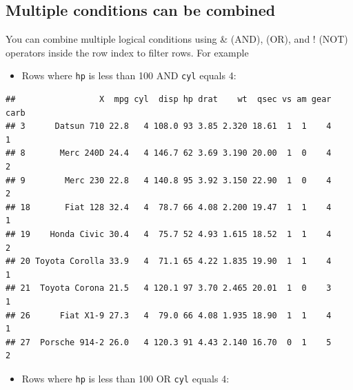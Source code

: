 \documentclass[
]{article}
\newenvironment{Shaded}{\begin{snugshade}}{\end{snugshade}}
\newcommand{\DecValTok}[1]{\textcolor[rgb]{0.00,0.00,0.81}{#1}}
\newcommand{\NormalTok}[1]{#1}
\newcommand{\SpecialCharTok}[1]{\textcolor[rgb]{0.81,0.36,0.00}{\textbf{#1}}}
\providecommand{\tightlist}{%
  \setlength{\itemsep}{0pt}\setlength{\parskip}{0pt}}
\begin{document}
\subsection{Multiple conditions can be
combined}\label{multiple-conditions-can-be-combined}

You can combine multiple logical conditions using \& (AND), \textbar{}
(OR), and ! (NOT) operators inside the row index to filter rows. For
example

\begin{itemize}
\tightlist
\item
  Rows where \texttt{hp} is less than 100 AND \texttt{cyl} equals 4:
\end{itemize}

\begin{Shaded}
\end{Shaded}

\begin{verbatim}
##                 X  mpg cyl  disp hp drat    wt  qsec vs am gear carb
## 3      Datsun 710 22.8   4 108.0 93 3.85 2.320 18.61  1  1    4    1
## 8       Merc 240D 24.4   4 146.7 62 3.69 3.190 20.00  1  0    4    2
## 9        Merc 230 22.8   4 140.8 95 3.92 3.150 22.90  1  0    4    2
## 18       Fiat 128 32.4   4  78.7 66 4.08 2.200 19.47  1  1    4    1
## 19    Honda Civic 30.4   4  75.7 52 4.93 1.615 18.52  1  1    4    2
## 20 Toyota Corolla 33.9   4  71.1 65 4.22 1.835 19.90  1  1    4    1
## 21  Toyota Corona 21.5   4 120.1 97 3.70 2.465 20.01  1  0    3    1
## 26      Fiat X1-9 27.3   4  79.0 66 4.08 1.935 18.90  1  1    4    1
## 27  Porsche 914-2 26.0   4 120.3 91 4.43 2.140 16.70  0  1    5    2
\end{verbatim}

\begin{itemize}
\tightlist
\item
  Rows where \texttt{hp} is less than 100 OR \texttt{cyl} equals 4:
\end{itemize}

\begin{Shaded}
\end{Shaded}
\end{document}
